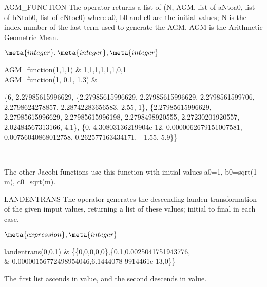 \begin{Operator}{AGM_FUNCTION}
The  operator returns a list of (N, AGM,
 list of aNtoa0, list of bNtob0, list of cNtoc0) where a0, b0 and c0 
are the initial values; N is the index number of the last term
used to generate the AGM.  AGM is the Arithmetic Geometric Mean.

\begin{Syntax}
\(\meta{integer},\meta{integer},\meta{integer}\)
\end{Syntax}

\begin{Examples}
AGM_function(1,1,1)   & {1,1,{1,1},{1,1},{0,1}}  \\
AGM_function(1, 0.1, 1.3) &
\begin{multilineoutput}{6cm}
\{6,
 2.27985615996629, 
 \{2.27985615996629, 2.27985615996629,
  2.2798561599706, 2.2798624278857, 
  2.28742283656583, 2.55, 1\},
 \{2.27985615996629, 2.27985615996629,
  2.27985615996198, 2.2798498920555, 
  2.27230201920557, 2.02484567313166, 4.1\},
 \{0, 4.30803136219904e-12, 0.0000062679151007581,
  0.00756040868012758, 0.262577163434171, - 1.55, 5.9\}\}
\end{multilineoutput} \\
\end{Examples}

\begin{Comments}
The other Jacobi functions use this function with initial values
a0=1, b0=sqrt(1-m), c0=sqrt(m). 
\end{Comments}
\end{Operator}

\begin{Operator}{LANDENTRANS}
The  operator generates the descending landen
transformation of the given imput values, returning a list of these
values; initial to final in each case.
\begin{Syntax}
\(\meta{expression},\meta{integer}\)
\end{Syntax}

\begin{Examples}
landentrans(0,0.1)    & \{\{0,0,0,0,0\},\{0.1,0.0025041751943776, \\
 & 0.00000156772498954046,6.1444078 9914461e-13,0\}\}  \\
\end{Examples}

\begin{Comments}
The first list ascends in value, and the second descends in value.
\end{Comments}
\end{Operator}


